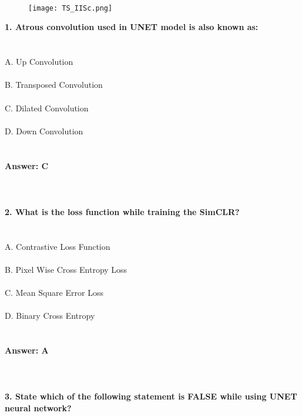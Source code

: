 \documentclass[prl,twocolumn,showpacs,preprintnumbers,superscriptaddress]{revtex4}
\theoremstyle{plain}
\theoremstyle{definition}
\begin{document}
\begin{widetext}
\\
\\
\\

\begin{wrapfigure}
\centering
\end{wrapfigure}
\begin{figure}[h!]
 \begin{right}
  \hfill\texttt{[image: TS\_IISc.png]}
 \end{right}
\end{figure}
\noindent\textbf{1. Atrous convolution used in UNET model is also known as:}
\\
\\
\\
A. Up Convolution
\\
\\
B. Transposed Convolution 
\\
\\
C. Dilated Convolution
\\
\\
D. Down Convolution
\\
\\
\\
\textbf{Answer: C}
\\
\\
\\
\\
\textbf{2. What is the loss function while training the SimCLR?}
\\
\\
\\
\noindent A. Contrastive Loss Function
\\
\\
B. Pixel Wise Cross Entropy Loss 
\\
\\
C. Mean Square Error Loss
\\
\\
D. Binary Cross Entropy
\\
\\
\\
\textbf{Answer: A}
\\
\\
\\
\\
\textbf{3. State which of the following statement is FALSE while using UNET neural network?}

\end{widetext}
\end{document}
